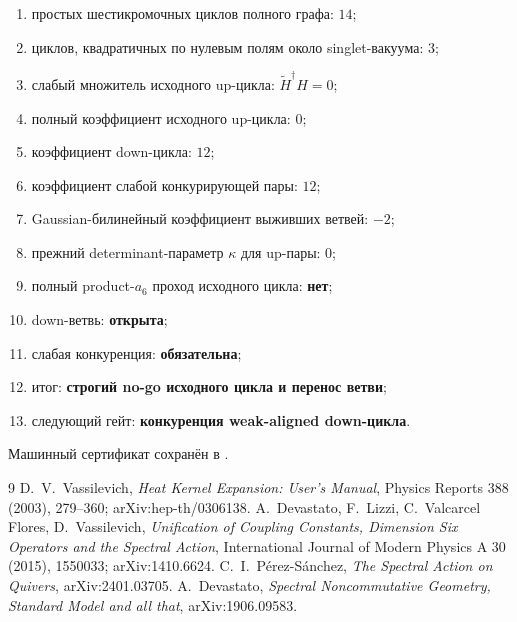 \begin{protocol}
\begin{enumerate}
 \item простых шестикромочных циклов полного графа: \textbf{$14$};
 \item циклов, квадратичных по нулевым полям около singlet-вакуума:
 \textbf{$3$};
 \item слабый множитель исходного up-цикла:
 \textbf{$\widetilde H^\dagger H=0$};
 \item полный коэффициент исходного up-цикла: \textbf{$0$};
 \item коэффициент down-цикла: \textbf{$12$};
 \item коэффициент слабой конкурирующей пары: \textbf{$12$};
 \item Gaussian-билинейный коэффициент выживших ветвей: \textbf{$-2$};
 \item прежний determinant-параметр $\kappa$ для up-пары: \textbf{$0$};
 \item полный product-$a_6$ проход исходного цикла: \textbf{нет};
 \item down-ветвь: \textbf{открыта};
 \item слабая конкуренция: \textbf{обязательна};
 \item итог: \textbf{строгий no-go исходного цикла и перенос ветви};
 \item следующий гейт: \textbf{конкуренция weak-aligned down-цикла}.
\end{enumerate}
\end{protocol}

Машинный сертификат сохранён в
.

\begin{thebibliography}{9}
D.~V.~Vassilevich, \emph{Heat Kernel Expansion: User's Manual},
Physics Reports 388 (2003), 279--360; arXiv:hep-th/0306138.
A.~Devastato, F.~Lizzi, C.~Valcarcel Flores, D.~Vassilevich,
\emph{Unification of Coupling Constants, Dimension Six Operators and the
Spectral Action}, International Journal of Modern Physics A 30 (2015),
1550033; arXiv:1410.6624.
C.~I.~P\'erez-S\'anchez,
\emph{The Spectral Action on Quivers}, arXiv:2401.03705.
A.~Devastato, \emph{Spectral Noncommutative Geometry, Standard Model and
all that}, arXiv:1906.09583.
\end{thebibliography}